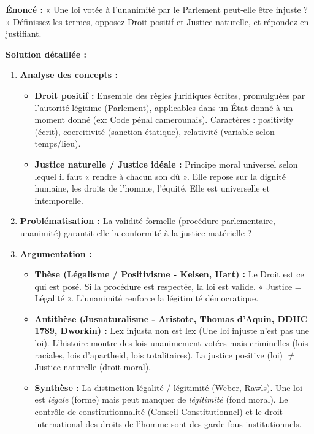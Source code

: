 \documentclass[11pt]{article}
\newcommand{\cle}[1]{{\popxbold\color{popdark}#1}}
\begin{document}
\begin{exoresolu}
\textbf{Énoncé :} « Une loi votée à l'unanimité par le Parlement peut-elle être injuste ? » Définissez les termes, opposez Droit positif et Justice naturelle, et répondez en justifiant.

\tcblower
\textbf{Solution détaillée :}
\begin{enumerate}
    \item \textbf{Analyse des concepts :}
    \begin{itemize}
        \item \textbf{Droit positif :} Ensemble des règles juridiques écrites, promulguées par l'autorité légitime (Parlement), applicables dans un État donné à un moment donné (ex: Code pénal camerounais). Caractères : \cle{positivity} (écrit), \cle{coercitivité} (sanction étatique), \cle{relativité} (variable selon temps/lieu).
        \item \textbf{Justice naturelle / Justice idéale :} Principe moral universel selon lequel il faut « rendre à chacun son dû ». Elle repose sur la \cle{dignité humaine}, les \cle{droits de l'homme}, l'\cle{équité}. Elle est \cle{universelle} et \cle{intemporelle}.
    \end{itemize}
    \item \textbf{Problématisation :} La validité formelle (procédure parlementaire, unanimité) garantit-elle la conformité à la justice matérielle ?
    \item \textbf{Argumentation :}
    \begin{itemize}
        \item \textbf{Thèse (Légalisme / Positivisme - Kelsen, Hart) :} Le Droit est ce qui est posé. Si la procédure est respectée, la loi est valide. « Justice = Légalité ». L'unanimité renforce la légitimité démocratique.
        \item \textbf{Antithèse (Jusnaturalisme - Aristote, Thomas d'Aquin, DDHC 1789, Dworkin) :} \cle{Lex injusta non est lex} (Une loi injuste n'est pas une loi). L'histoire montre des lois unanimement votées mais criminelles (lois raciales, lois d'apartheid, lois totalitaires). La justice positive (loi) $\neq$ Justice naturelle (droit moral).
        \item \textbf{Synthèse :} La distinction \cle{légalité / légitimité} (Weber, Rawls). Une loi est \emph{légale} (forme) mais peut manquer de \emph{légitimité} (fond moral). Le contrôle de constitutionnalité (Conseil Constitutionnel) et le droit international des droits de l'homme sont des garde-fous institutionnels.

\end{itemize}
\end{enumerate}
\end{exoresolu}
\end{document}
